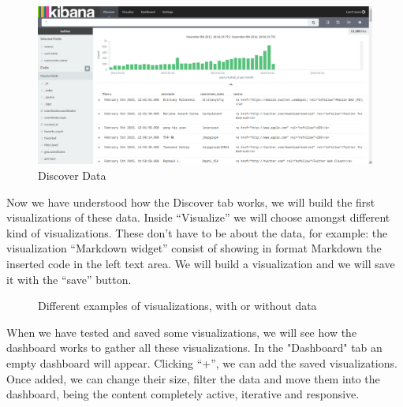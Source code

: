 \documentclass[a4paper, 12pt]{book}
\begin{document}
\begin{figure}[H]
  \centering
  \includegraphics[width=15cm, keepaspectratio]{img/development/twitterdiscoverdata}
  \caption{Discover Data}
  \label{fig:twitterdiscoverdata}
\end{figure}


Now we have understood how the Discover tab works, we will build the first visualizations of these data. Inside “Visualize” we will choose amongst different kind of visualizations. These don’t have to be about the data, for example: the visualization “Markdown widget” consist of showing in format Markdown the inserted code in the left text area. We will build a visualization and we will save it with the “save” button.

\begin{figure}[H]
 \centering
 \caption{Different examples of visualizations, with or without data}
 \label{f:fc2}
\end{figure}


When we have tested and saved some visualizations, we will see how the dashboard works to gather all these visualizations. In the "Dashboard" tab an empty dashboard will appear. Clicking “+”, we can add the saved visualizations. Once added, we can change their size, filter the data and move them into the dashboard, being the content completely active, iterative and responsive.
\end{document}
